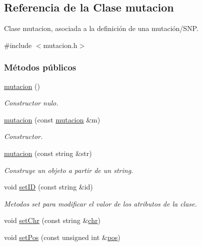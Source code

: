\hypertarget{classmutacion}{\subsection{Referencia de la Clase mutacion}
\label{classmutacion}
}


Clase mutacion, asociada a la definición de una mutación/\-S\-N\-P.  




{\ttfamily \#include $<$mutacion.\-h$>$}

\subsubsection*{Métodos públicos}
\begin{DoxyCompactItemize}
\item 
\hyperlink{classmutacion_a01cb8b2307eacbfb415f99373ff3c64a}{mutacion} ()
\begin{DoxyCompactList}\small\item\em Constructor nulo. \end{DoxyCompactList}\item 
\hyperlink{classmutacion_a6bcb17c723a359ffac7dda8d5d427dfe}{mutacion} (const \hyperlink{classmutacion}{mutacion} \&m)
\begin{DoxyCompactList}\small\item\em Constructor. \end{DoxyCompactList}\item 
\hyperlink{classmutacion_a8c5cc5b5146c511b9a1d6976156389c3}{mutacion} (const string \&str)
\begin{DoxyCompactList}\small\item\em Construye un objeto a partir de un string. \end{DoxyCompactList}\item 
void \hyperlink{classmutacion_af6288453d3cb4e29b8be304ca262b170}{set\-I\-D} (const string \&id)
\begin{DoxyCompactList}\small\item\em Metodos set para modificar el valor de los atributos de la clase. \end{DoxyCompactList}\item 
void \hyperlink{classmutacion_a147ee1f35c78ab0b7cf891067bf2e336}{set\-Chr} (const string \&\hyperlink{classmutacion_a57651966b952f782240ff9cff72c5d2f}{chr})
\item 
void \hyperlink{classmutacion_a2667189a28d3ac983a8f63ca92e81fba}{set\-Pos} (const unsigned int \&\hyperlink{classmutacion_ae1487b8648d0eaad68de5e4e5a87f3ff}{pos})

\end{DoxyCompactItemize}
